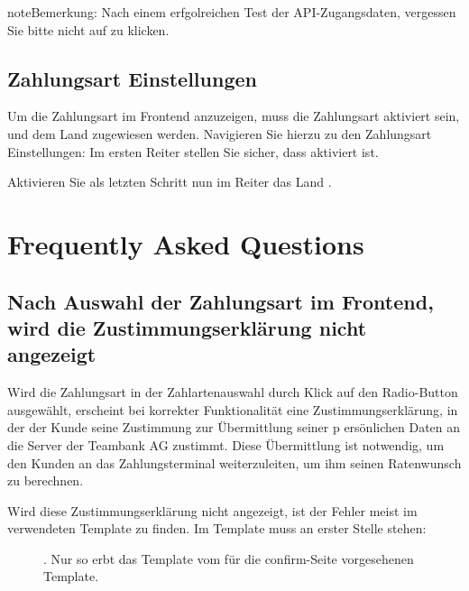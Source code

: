 \documentclass[a4paper,10pt,openany,oneside,ngerman]{sphinxmanual}
\begin{document}
\begin{sphinxadmonition}{note}{Bemerkung:}
Nach einem erfgolreichen Test der API-Zugangsdaten, vergessen Sie bitte nicht auf  zu klicken.
\end{sphinxadmonition}


\section{Zahlungsart Einstellungen}
\label{\detokenize{configuration:zahlungsart-einstellungen}}
Um die Zahlungsart  im Frontend anzuzeigen, muss die Zahlungsart aktiviert sein, und dem Land  zugewiesen werden. Navigieren Sie hierzu zu den Zahlungsart Einstellungen: 
Im ersten Reiter  stellen Sie sicher, dass  aktiviert ist.

\noindent{}

\clearpage

Aktivieren Sie als letzten Schritt nun im Reiter  das Land .

\noindent{}


\chapter{Frequently Asked Questions}
\label{\detokenize{faq::doc}}\label{\detokenize{faq:frequently-asked-questions}}

\section{Nach Auswahl der Zahlungsart im Frontend, wird die Zustimmungserklärung nicht angezeigt}
\label{\detokenize{faq:nach-auswahl-der-zahlungsart-im-frontend-wird-die-zustimmungserklarung-nicht-angezeigt}}
Wird die Zahlungsart in der Zahlartenauswahl durch Klick auf den Radio-Button ausgewählt, erscheint bei korrekter Funktionalität eine Zustimmungserklärung, in der der Kunde seine Zustimmung zur Übermittlung seiner p
ersönlichen Daten an die Server der Teambank AG zustimmt. Diese Übermittlung ist notwendig, um den Kunden an das Zahlungsterminal weiterzuleiten, um ihm seinen Ratenwunsch zu berechnen.
\begin{description}
\item[{Wird diese Zustimmungserklärung nicht angezeigt, ist der Fehler meist im verwendeten Template zu finden. Im Template  muss an erster Stelle stehen:}] \leavevmode
{}. Nur so erbt das Template vom für die confirm-Seite vorgesehenen Template.

\end{description}
\end{document}
